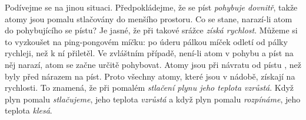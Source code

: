 {      Podívejme se na jinou situaci. Předpokládejme, že se píst \emph{pohybuje dovnitř}, takže 
      atomy jsou pomalu stlačovány do menšího prostoru. Co se stane, narazí-li atom do pohybujícího 
      se pístu? Je jasné, že při takové srážce \emph{získá rychlost}. Můžeme si to vyzkoušet na 
      ping-pongovém míčku: po úderu pálkou míček odletí od pálky rychleji, než k ní přiletěl. Ve 
      zvláštním případě, není-li atom v pohybu a píst na něj narazí, atom se začne určitě 
      pohybovat. Atomy jsou při návratu od pístu , než byly před nárazem na píst. 
      Proto všechny atomy, které jsou v nádobě, získají na rychlosti. To znamená, že při pomalém 
      \emph{stlačení plynu jeho teplota vzrůstá}. Když plyn pomalu \emph{stlačujeme}, jeho teplota 
      \emph{vzrůstá} a když plyn pomalu \emph{rozpínáme}, jeho teplota \emph{klesá}.
      
}
